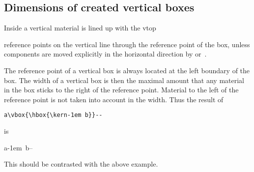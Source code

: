 \documentclass{book}
\begin{document}
\subsection{Dimensions of created vertical boxes}

Inside a  vertical material is lined up with the
\cstoidx vtop\par
reference points on the vertical line through the reference
point of the box,
unless components are moved explicitly in the horizontal direction
by  or~.

The  reference point of a vertical box
is always located at the left boundary of the box.
The width of a vertical box
is then the maximal amount that any material in the
box sticks to the right of the reference point.
Material to the left of the reference point is
not taken into account in the width.
Thus the result of
\begin{disp}\verb>a\vbox{\hbox{\kern-1em b}}-->\end{disp}
is
\begin{disp}\leavevmode\hphantom{b}a\vbox{\hbox{\kern-1em b}}--\end{disp}
This should be contrasted with the above example.
\end{document}
